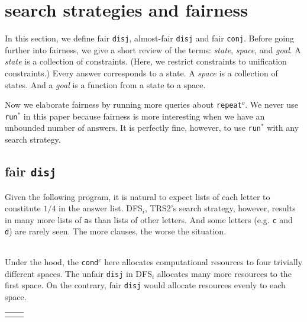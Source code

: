 \documentclass[format=acmlarge, review=true, authordraft=true]{acmart}
\newcommand{\conde}{\texttt{cond$^e$}}
\newcommand{\conj}{\texttt{conj}}
\newcommand{\disj}{\texttt{disj}}
\newcommand{\repeato}{\texttt{repeat$^o$}}
\newcommand{\runstar}{\texttt{run$^*$}}
\newcommand{\DFSi }[0]{DFS$_{i}$}
\begin{document}
\section{search strategies and fairness}

In this section, we define fair \disj{}, almost-fair \disj{} and fair \conj{}. 
Before going further into fairness, we give a short review of the terms:
\emph{state}, \emph{space}, and \emph{goal}.
A \emph{state} is a collection of constraints. (Here, we restrict 
constraints to unification constraints.) Every answer corresponds to a 
state. A \emph{space} is a collection of states. And a \emph{goal} is a 
function from a state to a space.

Now we elaborate fairness by running more queries about \repeato{}. We never 
use \runstar{} in this paper because fairness is more interesting when we 
have an unbounded number of answers. It is perfectly fine, however, to use 
\runstar{} with any search strategy.

\subsection{fair \texttt{disj}}

Given the following program, it is natural to expect lists of each
letter to constitute $1/4$ in the answer list. \DFSi, TRS2's search
strategy, however, results in many more lists of \texttt{a}s than
lists of other letters. And some letters (e.g. \texttt{c} and
\texttt{d}) are rarely seen. The more clauses, the worse the situation.

\begin{center}
	\begin{tabular}{c}
		
	\end{tabular}
\end{center}

Under the hood, the \conde{} here allocates computational resources to 
four trivially different spaces. The unfair \disj{} in 
\DFSi{} allocates many more resources to the first space. On the 
contrary, fair \disj{} would allocate resources evenly to each space. 

\begin{center}
	\begin{tabular}{l|r}
		 &
		
	\end{tabular}
\end{center}
\end{document}
